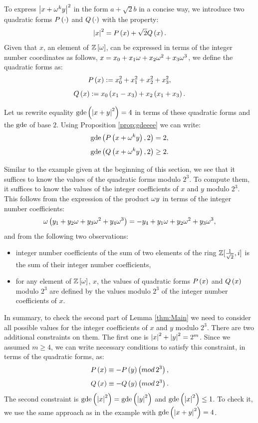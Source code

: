 \documentclass[english,journal]{extarticle}
\theoremstyle{plain}
\theoremstyle{plain}
\theoremstyle{plain}
\theoremstyle{definition}
\theoremstyle{plain}
\theoremstyle{plain}
\newcommand{\mathref}[2]{\hyperref[msym:#1]{#2}}
\begin{document}
To express $\abs{x+\w^{k}y}^{2}$ in the form $a+\sqrt{2}b$ in a concise
way, we introduce two quadratic forms $\P{\cdot}$ and
$\Q{\cdot}$ with the property: 
\begin{equation}
\abs x^{2}=\P{x}+\sqrt{2} \Q{x}.\label{eq:abs}
\end{equation}
Given that $x$, an element of $\Zr$, can be expressed
in terms of the integer number coordinates as follows, $x=x_{0}+x_{1}\w+x_{2}\w^{2}+x_{3}\w^{3}$,
we define the quadratic forms as: 
\begin{equation}
\P{x}:=x_{0}^{2}+x_{1}^{2}+x_{2}^{2}+x_{3}^{2},\label{eq:ipxx}
\end{equation}
\begin{equation}
\Q{x}:=x_{0}\left(x_{1}-x_{3}\right)+x_{2}\left(x_{1}+x_{3}\right).\label{eq:ips2xx}
\end{equation}

Let us rewrite equality $\gde\left(\abs{x+y}^{2}\right)=4$
in terms of these quadratic forms and the $\gde$ of base $2$. Using
Proposition \ref{prop:gdeeee} we can write: 
\[
\gde\left(\P{x+\w^{k}y},2\right)=2,
\]
\[
\gde\left(\Q{x+\w^{k}y},2\right)\ge 2.
\]

Similar to the example given at the beginning of this section, we see that
it suffices to know the values of the quadratic forms modulo $2^{3}$.
To compute them, it suffices to know the values of the integer coefficients
of $x$ and $y$ modulo $2^{3}$.  This follows from the expression
of the product $\w y$ in terms of the integer number coefficients: 
\[
\w\left(y_{1}+y_{2}\w+y_{3}\w^{2}+y_{4}\w^{3}\right)=-y_{4}+y_{1}\w+y_{2}\w^{2}
+y_{3}\w^{3},
\]
and from the following two observations:
\begin{itemize}
\item integer number coefficients of the sum of two elements of the ring $\R$ is the sum of their integer number
coefficients, 
\item for any element of $\Zr$, $x$, the values of quadratic forms $\P{x}$ and $\Q{x}$
modulo $2^{3}$ are defined by the values modulo $2^{3}$ of the integer number coefficients of $x$. 
\end{itemize}
In summary, to check the second part of Lemma \ref{thm:Main} we
need to consider all possible values for the integer coefficients
of $x$ and $y$ modulo $2^{3}$.  There are two additional constraints on
them. The first one is $\abs x^{2}+\abs y^{2}=2^{m}$. Since we assumed
$m\ge 4$, we can write necessary conditions to satisfy this constraint,
in terms of the quadratic forms, as: 
\[
\P{x}\equiv -\P{y} \left(mod\,2^{3}\right),
\]
\[
\Q{x} \equiv -\Q{y} \left(mod\,2^{3}\right).
\]
The second constraint is $\gde\left(\abs x^{2}\right)=\gde\left(\abs y^{2}\right)$
and $\gde\left(\abs x^{2}\right)\le 1$. To check it, we use the same
approach as in the example with $\gde\left(\abs{x+y}^{2}\right)=4$.
\end{document}
